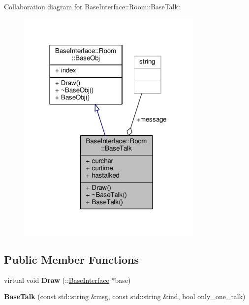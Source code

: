 Collaboration diagram for Base\+Interface\+:\+:Room\+:\+:Base\+Talk\+:
\nopagebreak
\begin{figure}[H]
\begin{center}
\leavevmode
\includegraphics[width=258pt]{d9/d0d/classBaseInterface_1_1Room_1_1BaseTalk__coll__graph}
\end{center}
\end{figure}
\subsection*{Public Member Functions}
\begin{DoxyCompactItemize}
\item 
virtual void {\bfseries Draw} (\+::\hyperlink{classBaseInterface}{Base\+Interface} $\ast$base)\hypertarget{classBaseInterface_1_1Room_1_1BaseTalk_a7fb3bfe7945d94f00553bcec33e2dde3}{}\label{classBaseInterface_1_1Room_1_1BaseTalk_a7fb3bfe7945d94f00553bcec33e2dde3}

\item 
{\bfseries Base\+Talk} (const std\+::string \&msg, const std\+::string \&ind, bool only\+\_\+one\+\_\+talk)\hypertarget{classBaseInterface_1_1Room_1_1BaseTalk_aaba6c033732cd584c37f1ac7b0c11a17}{}\label{classBaseInterface_1_1Room_1_1BaseTalk_aaba6c033732cd584c37f1ac7b0c11a17}

\end{DoxyCompactItemize}
